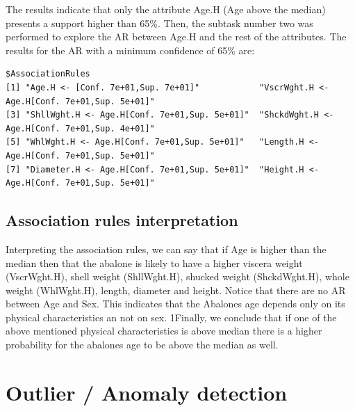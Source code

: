 \documentclass[10pt, paper=a4]{article}
\begin{document}
The results indicate that only the attribute Age.H (Age above the median)
presents a support higher than 65\%.  Then, the subtask number two was performed
to explore the AR between Age.H and the rest of the attributes.  The results for
the AR with a minimum confidence of 65\% are:
\begin{verbatim}
$AssociationRules
[1] "Age.H <- [Conf. 7e+01,Sup. 7e+01]"            "VscrWght.H <- Age.H[Conf. 7e+01,Sup. 5e+01]" 
[3] "ShllWght.H <- Age.H[Conf. 7e+01,Sup. 5e+01]"  "ShckdWght.H <- Age.H[Conf. 7e+01,Sup. 4e+01]"
[5] "WhlWght.H <- Age.H[Conf. 7e+01,Sup. 5e+01]"   "Length.H <- Age.H[Conf. 7e+01,Sup. 5e+01]"   
[7] "Diameter.H <- Age.H[Conf. 7e+01,Sup. 5e+01]"  "Height.H <- Age.H[Conf. 7e+01,Sup. 5e+01]"
\end{verbatim}

\subsection{Association rules interpretation}
Interpreting the association rules, we can say that if Age is higher than the
median then that the abalone is likely to have a higher viscera weight
(VscrWght.H), shell weight (ShllWght.H), shucked weight (ShckdWght.H), whole
weight (WhlWght.H), length, diameter and height.  Notice that there are no AR
between Age and Sex.  This indicates that the Abalones age depends only on its
physical characteristics an not on sex.  1Finally, we conclude that if one of the
above mentioned physical characteristics is above median there is a higher
probability for the abalones age to be above the median as well.

\section{Outlier / Anomaly detection}
\label{sec:detection}

\end{document}
